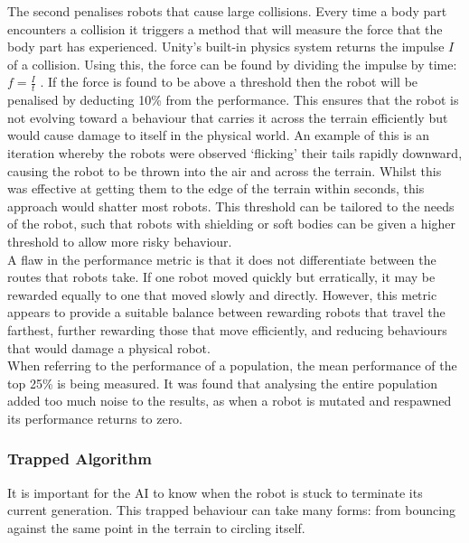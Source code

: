 \documentclass{article}
\begin{document}
\noindent The second penalises robots that cause large collisions. Every time a body part encounters a collision it triggers a method that will measure the force that the body part has experienced. Unity's built-in physics system returns the impulse $I$ of a collision. Using this, the force can be found by dividing the impulse by time: {\Large $f = \frac{I}{t}$} .
If the force is found to be above a threshold then the robot will be penalised by deducting 10\% from the performance. This ensures that the robot is not evolving toward a behaviour that carries it across the terrain efficiently but would cause damage to itself in the physical world. An example of this is an iteration whereby the robots were observed ‘flicking’ their tails rapidly downward, causing the robot to be thrown into the air and across the terrain. Whilst this was effective at getting them to the edge of the terrain within seconds, this approach would shatter most robots. This threshold can be tailored to the needs of the robot, such that robots with shielding or soft bodies can be given a higher threshold to allow more risky behaviour.\\

A flaw in the performance metric is that it does not differentiate between the routes that robots take. If one robot moved quickly but erratically, it may be rewarded equally to one that moved slowly and directly. However, this metric appears to provide a suitable balance between rewarding robots that travel the farthest, further rewarding those that move efficiently, and reducing behaviours that would damage a physical robot. \\

When referring to the performance of a population, the mean performance of the top 25\% is being measured. It was found that analysing the entire population added too much noise to the results, as when a robot is mutated and respawned its performance returns to zero.

\newpage
\subsubsection{Trapped Algorithm}
\label{sec:Trapped Imp}
It is important for the AI to know when the robot is stuck to terminate its current generation. This trapped behaviour can take many forms: from bouncing against the same point in the terrain to circling itself.\\
\end{document}
